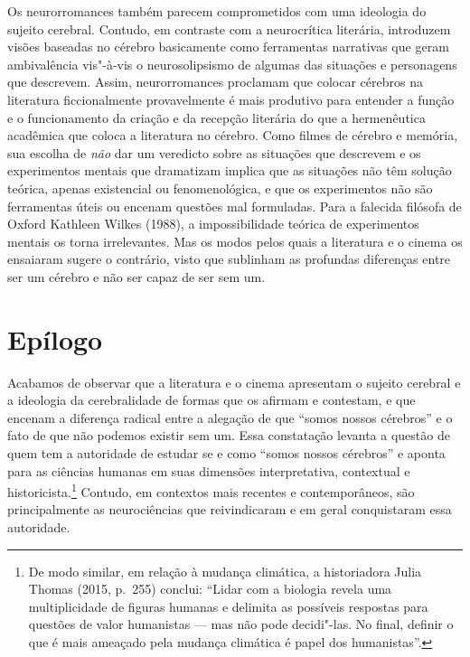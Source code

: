 Os neurorromances também parecem comprometidos com uma ideologia do
sujeito cerebral. Contudo, em contraste com a neurocrítica literária,
introduzem visões baseadas no cérebro basicamente como ferramentas
narrativas que geram ambivalência vis"-à-vis o neurosolipsismo de algumas
das situações e personagens que descrevem. Assim, neurorromances
proclamam que colocar cérebros na literatura ficcionalmente
provavelmente é mais produtivo para entender a função e o funcionamento
da criação e da recepção literária do que a hermenêutica acadêmica que
coloca a literatura no cérebro. Como filmes de cérebro e memória, sua
escolha de \emph{não} dar um veredicto sobre as situações que descrevem
e os experimentos mentais que dramatizam implica que as situações não
têm solução teórica, apenas existencial ou fenomenológica, e que os
experimentos não são ferramentas úteis ou encenam questões mal
formuladas. Para a falecida filósofa de Oxford Kathleen Wilkes (1988), a
impossibilidade teórica de experimentos mentais os torna irrelevantes.
Mas os modos pelos quais a literatura e o cinema os ensaiaram sugere o
contrário, visto que sublinham as profundas diferenças entre ser um
cérebro e não ser capaz de ser sem um.

\chapter{Epílogo}

Acabamos de observar que a literatura e o cinema apresentam o sujeito
cerebral e a ideologia da cerebralidade de formas que os afirmam e
contestam, e que encenam a diferença radical entre a alegação de que
``somos nossos cérebros'' e o fato de que não podemos existir sem um.
Essa constatação levanta a questão de quem tem a autoridade de estudar
se e como ``somos nossos cérebros'' e aponta para as ciências humanas em
suas dimensões interpretativa, contextual e
historicista.\footnote[1]{De modo similar, em relação à mudança climática, a historiadora
Julia Thomas (2015, p.~255) conclui: ``Lidar com a biologia revela uma
multiplicidade de figuras humanas e delimita as possíveis respostas para
questões de valor humanistas --- mas não pode decidi"-las. No final,
definir o que é mais ameaçado pela mudança climática é papel dos
humanistas''.} Contudo, em contextos mais recentes e
contemporâneos, são principalmente as neurociências que reivindicaram e
em geral conquistaram essa autoridade.

